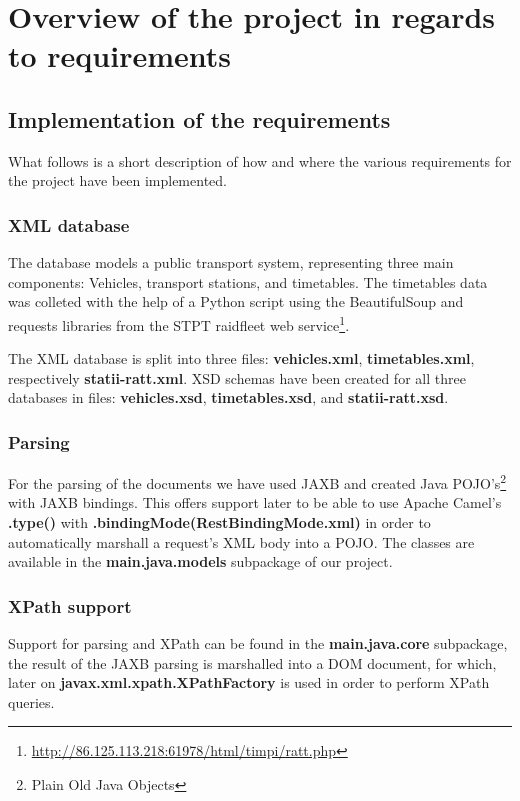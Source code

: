 \chapter{Overview of the project in regards to requirements}

\section{Implementation of the requirements}

What follows is a short description of how and where the various requirements for the project have been implemented.

\subsection{XML database}

The database models a public transport system, representing three main components: Vehicles, transport stations, and timetables. The timetables data was colleted with the help of a Python script using the BeautifulSoup and requests libraries from the STPT raidfleet web service\footnote{\url{http://86.125.113.218:61978/html/timpi/ratt.php}}.

The XML database is split into three files: \textbf{vehicles.xml}, \textbf{timetables.xml}, respectively \textbf{statii-ratt.xml}. XSD schemas have been created for all three databases in files: \textbf{vehicles.xsd}, \textbf{timetables.xsd}, and \textbf{statii-ratt.xsd}.

\subsection{Parsing}

For the parsing of the documents we have used JAXB and created Java POJO's\footnote{Plain Old Java Objects} with JAXB bindings. This offers support later to be able to use Apache Camel's \textbf{.type()} with \textbf{.bindingMode(RestBindingMode.xml)} in order to automatically marshall a request's XML body into a POJO. The classes are available in the \textbf{main.java.models} subpackage of our project.

\subsection{XPath support}

Support for parsing and XPath can be found in the \textbf{main.java.core} subpackage, the result of the JAXB parsing is marshalled into a DOM document, for which, later on \textbf{javax.xml.xpath.XPathFactory} is used in order to perform XPath queries.

